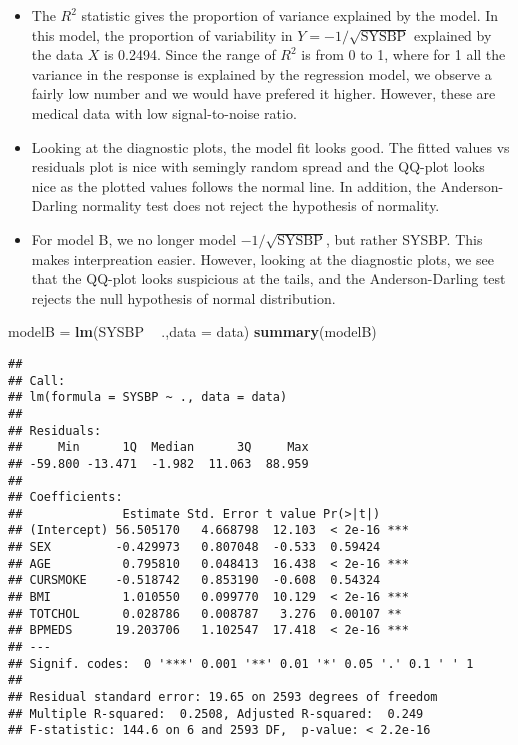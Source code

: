 \documentclass[]{article}
\newenvironment{Shaded}{\begin{snugshade}}{\end{snugshade}}
\newcommand{\KeywordTok}[1]{\textcolor[rgb]{0.13,0.29,0.53}{\textbf{#1}}}
\newcommand{\DataTypeTok}[1]{\textcolor[rgb]{0.13,0.29,0.53}{#1}}
\newcommand{\StringTok}[1]{\textcolor[rgb]{0.31,0.60,0.02}{#1}}
\newcommand{\OperatorTok}[1]{\textcolor[rgb]{0.81,0.36,0.00}{\textbf{#1}}}
\newcommand{\NormalTok}[1]{#1}
\providecommand{\tightlist}{%
  \setlength{\itemsep}{0pt}\setlength{\parskip}{0pt}}
\begin{document}
\begin{itemize}
\tightlist
\item
  {The \(R^2\) statistic gives the proportion of variance explained by
  the model. In this model, the proportion of variability in
  \(Y=-1/\sqrt{\text{SYSBP}}\) explained by the data \(X\) is 0.2494.
  Since the range of \(R^2\) is from 0 to 1, where for 1 all the
  variance in the response is explained by the regression model, we
  observe a fairly low number and we would have prefered it higher.
  However, these are medical data with low signal-to-noise ratio.}
\item
  {Looking at the diagnostic plots, the model fit looks good. The fitted
  values vs residuals plot is nice with semingly random spread and the
  QQ-plot looks nice as the plotted values follows the normal line. In
  addition, the Anderson-Darling normality test does not reject the
  hypothesis of normality.}
\item
  {For model B, we no longer model \(-1/\sqrt{\text{SYSBP}}\), but
  rather SYSBP. This makes interpreation easier. However, looking at the
  diagnostic plots, we see that the QQ-plot looks suspicious at the
  tails, and the Anderson-Darling test rejects the null hypothesis of
  normal distribution.}
\end{itemize}

\begin{Shaded}
\begin{Highlighting}[]
\NormalTok{modelB =}\StringTok{ }\KeywordTok{lm}\NormalTok{(SYSBP }\OperatorTok{~}\StringTok{ }\NormalTok{.,}\DataTypeTok{data =}\NormalTok{ data)}
\KeywordTok{summary}\NormalTok{(modelB)}
\end{Highlighting}
\end{Shaded}

\begin{verbatim}
## 
## Call:
## lm(formula = SYSBP ~ ., data = data)
## 
## Residuals:
##     Min      1Q  Median      3Q     Max 
## -59.800 -13.471  -1.982  11.063  88.959 
## 
## Coefficients:
##              Estimate Std. Error t value Pr(>|t|)    
## (Intercept) 56.505170   4.668798  12.103  < 2e-16 ***
## SEX         -0.429973   0.807048  -0.533  0.59424    
## AGE          0.795810   0.048413  16.438  < 2e-16 ***
## CURSMOKE    -0.518742   0.853190  -0.608  0.54324    
## BMI          1.010550   0.099770  10.129  < 2e-16 ***
## TOTCHOL      0.028786   0.008787   3.276  0.00107 ** 
## BPMEDS      19.203706   1.102547  17.418  < 2e-16 ***
## ---
## Signif. codes:  0 '***' 0.001 '**' 0.01 '*' 0.05 '.' 0.1 ' ' 1
## 
## Residual standard error: 19.65 on 2593 degrees of freedom
## Multiple R-squared:  0.2508, Adjusted R-squared:  0.249 
## F-statistic: 144.6 on 6 and 2593 DF,  p-value: < 2.2e-16
\end{verbatim}
\end{document}
